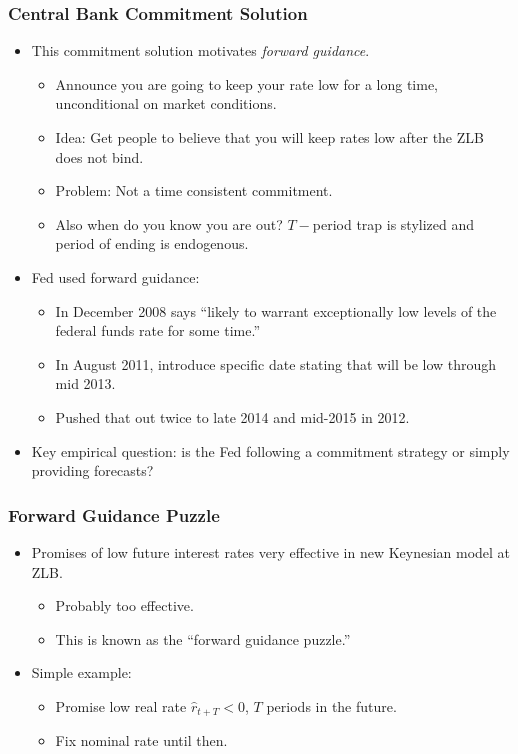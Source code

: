 \documentclass[english,xcolor=svgnames]{beamer}
\begin{document}
\begin{frame}
\frametitle{Central Bank Commitment Solution}
\begin{itemize}
	\item This commitment solution motivates \emph{forward guidance}.
	\begin{itemize}
		\item Announce you are going to keep your rate low for a long time, unconditional on market conditions.
		\item Idea: Get people to believe that you will keep rates low after the ZLB does not bind.
		\item Problem: Not a time consistent commitment.
		\item Also when do you know you are out? $T-$period trap is stylized and period of ending is endogenous.
	\end{itemize}
	\item Fed used forward guidance:
	\begin{itemize}
		\item In December 2008 says ``likely to warrant exceptionally low levels of the federal funds rate for some time.''
		\item In August 2011, introduce specific date stating that will be low through mid 2013.
		\item Pushed that out twice to late 2014 and mid-2015 in 2012.
	\end{itemize}
	\item Key empirical question: is the Fed following a commitment strategy or simply providing forecasts?
\end{itemize}	
\end{frame}

\begin{frame}
\frametitle{Forward Guidance Puzzle}
\begin{itemize}
	\item Promises of low future interest rates very effective in new Keynesian model at ZLB.
	\begin{itemize}
		\item Probably too effective.
		\item This is known as the ``forward guidance puzzle.''
	\end{itemize}
	\item Simple example:
	\begin{itemize}
		\item Promise low real rate $\hat{r}_{t+T}<0$, $T$ periods in the future.
		\item Fix nominal rate until then.
	\end{itemize}
\end{itemize}	
\end{frame}
\end{document}
